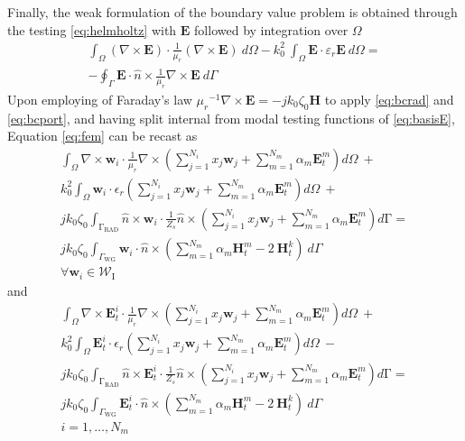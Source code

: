 \documentclass[journal,twoside,letterpaper]{IEEEtran}
\renewcommand{\vec}[1]{\mathbf{#1}}
\begin{document}
Finally, the weak formulation of the boundary value problem is obtained through the testing \eqref{eq:helmholtz} with $\vec{E}$ followed by integration over $\Omega$
%
\begin{multline}
\label{eq:fem}
\int_\Omega (\nabla \times \vec{E})  \cdot \frac{1}{\mu_r}(\nabla \times \vec{E}) \ d\Omega
- k_0^2 \ \int_\Omega \vec{E}  \cdot \varepsilon_r \vec{E} \ d\Omega = \\ 
- \oint_{\Gamma} \vec{E}  \cdot \hat{n} \times \frac{1}{\mu_r} \nabla \times \vec{E} \ d\Gamma 
\end{multline} 
%
Upon employing of Faraday's law ${\mu_r} ^{-1} \nabla \times \vec{E} = - j k_0 \zeta_0 \vec{H}$  to apply \eqref{eq:bcrad} and \eqref{eq:bcport}, and having split internal from modal testing functions of \eqref{eq:basisE}, Equation \eqref{eq:fem} can be recast as
\begin{multline}
\label{eq:FEMformTFE1}
\int_\Omega \nabla \times \vec{w}_i \cdot \frac{1}{\mu_r} \nabla \times \left( \sum_{j=1}^{N_i} x_j \vec{w}_j + \sum_{m=1}^{N_m} \alpha_m \vec{E}_t^m \right) d\Omega \ +\\
 k_0^2 \int_\Omega \vec{w}_i \cdot \epsilon_r \left( \sum_{j=1}^{N_i} x_j \vec{w}_j + \sum_{m=1}^{N_m} \alpha_m \vec{E}_t^m \right) d\Omega \ +\\
 j k_0 \zeta_0 \int_{\mathrm{\Gamma}_\text{RAD}} \hat{n} \times \vec{w}_i \cdot \frac{1}{Z_s} \hat{n} \times \left( \sum_{j=1}^{N_i} x_j \vec{w}_j + \sum_{m=1}^{N_m} \alpha_m \vec{E}_t^m \right) d\mathrm{\Gamma} =\\ 
 j k_0 \zeta_0 \int_{\Gamma_\text{WG}}  \vec{w}_i \cdot \hat{n} \times \left( \sum_{m=1}^{N_m} \alpha_m \vec{H}_t^m - 2 \ \vec{H}_t^k \right) \ d\Gamma\\
\forall \vec{w}_i \in \mathcal{W}_\text{I}
\end{multline}
%
\noindent and
%
\begin{multline}
\label{eq:FEMformTFE2}
\int_\Omega \nabla \times \vec{E}_t^{i} \cdot \frac{1}{\mu_r} \nabla \times \left( \sum_{j=1}^{N_i} x_j \vec{w}_j + \sum_{m=1}^{N_m} \alpha_m \vec{E}_t^m \right)  d\Omega \ +\\
 k_0^2 \int_\Omega \vec{E}_t^{i} \cdot \epsilon_r \left( \sum_{j=1}^{N_i} x_j \vec{w}_j + \sum_{m=1}^{N_m} \alpha_m \vec{E}_t^m \right) d\Omega \ - \\ 
j k_0 \zeta_0 \int_{\mathrm{\Gamma}_\text{RAD}} \hat{n} \times \vec{E}_t^{i} \cdot \frac{1}{Z_s} \hat{n} \times \left( \sum_{j=1}^{N_i} x_j \vec{w}_j + \sum_{m=1}^{N_m} \alpha_m \vec{E}_t^m \right) d\mathrm{\Gamma} = \\
 j k_0 \zeta_0 \int_{\Gamma_\text{WG}}  \vec{E}_t^{i} \cdot \hat{n} \times \left( \sum_{m=1}^{N_m} \alpha_m \vec{H}_t^m - 2 \ \vec{H}_t^k \right) \ d\Gamma\\
i = 1, \ldots, N_m
\end{multline}
\end{document}
